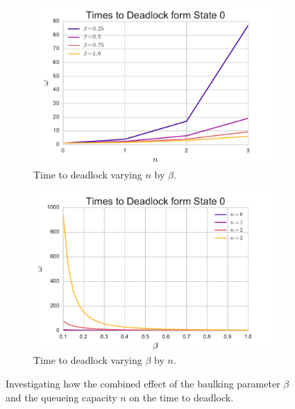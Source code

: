 \documentclass{article}
\begin{document}
\begin{figure}
\begin{center}
\begin{subfigure}[b]{0.45\textwidth}
    \includegraphics[width=\textwidth]{img/varyn_bybeta.pdf}
    \caption{Time to deadlock varying $n$ by $\beta$.}
    \label{fig:varynbybeta}
\end{subfigure}
\begin{subfigure}[b]{0.45\textwidth}
    \includegraphics[width=\textwidth]{img/varybeta_byn.pdf}
    \caption{Time to deadlock varying $\beta$ by $n$.}
    \label{fig:varybetabyn}
\end{subfigure}
\end{center}
\caption{Investigating how the combined effect of the baulking parameter $\beta$ and the queueing capacity $n$ on the time to deadlock.}
\label{fig:combinedeffect_betan}
\end{figure}
\end{document}
